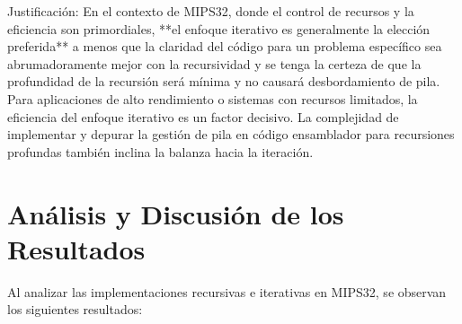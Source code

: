\documentclass{article}
\begin{document}
 Justificación:
En el contexto de MIPS32, donde el control de recursos y la eficiencia son primordiales, **el enfoque iterativo es generalmente la elección preferida** a menos que la claridad del código para un problema específico sea abrumadoramente mejor con la recursividad y se tenga la certeza de que la profundidad de la recursión será mínima y no causará desbordamiento de pila. Para aplicaciones de alto rendimiento o sistemas con recursos limitados, la eficiencia del enfoque iterativo es un factor decisivo. La complejidad de implementar y depurar la gestión de pila en código ensamblador para recursiones profundas también inclina la balanza hacia la iteración.

\section{Análisis y Discusión de los Resultados}

Al analizar las implementaciones recursivas e iterativas en MIPS32, se observan los siguientes resultados:
\end{document}
